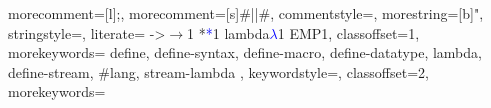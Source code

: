 
\lstset{numbers=left,xleftmargin=2em,framexleftmargin=1.5em}

	 {
		morecomment=[l]{;},         %
		morecomment=[s]{\#|}{|\#},  %
		commentstyle={\color{brown}\slshape\sffamily},
		morestring=[b]",
		stringstyle=\color{red},
		literate=%
		{->}{{$\rightarrow$}}1
		{*}{{\textcolor{blue}{*}}}1
		{lambda}{{\textcolor{blue}{\(\lambda\)}}}1
		{EMP}{{\ep{}}}1,
		classoffset=1,
		morekeywords={
			define, define-syntax, define-macro, define-datatype, lambda, define-stream, \#lang, stream-lambda
		},
		keywordstyle=\color{purple},
		classoffset=2,
		morekeywords={
}}
